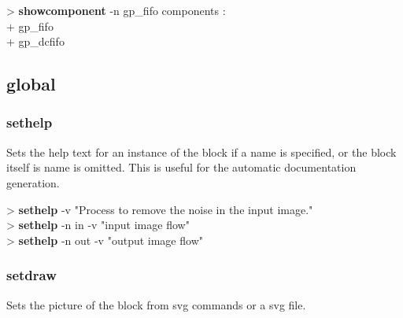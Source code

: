 \documentclass[10pt,a4paper]{article}
\begin{document}
\begin{sampletitle}
> \textbf{\tool{} showcomponent} -n gp\_fifo
components :\\
  + gp\_fifo \\
  + gp\_dcfifo
\end{sampletitle}

\subsection{global}
\subsubsection{sethelp}
\label{subsec:sethelp}

Sets the help text for an instance of the block if a name is specified, or the block itself is name is omitted. This is useful for the automatic documentation generation. \\


\begin{sampletitle}
> \textbf{\tool{} sethelp} -v "Process to remove the noise in the input image." \\
> \textbf{\tool{} sethelp} -n in -v "input image flow" \\
> \textbf{\tool{} sethelp} -n out -v "output image flow"
\end{sampletitle}

\subsubsection{setdraw}

Sets the picture of the block from svg commands or a svg file. \\
\end{document}
